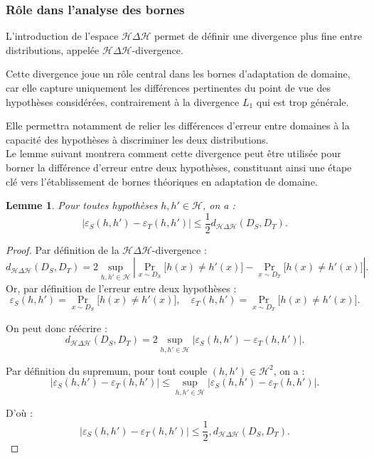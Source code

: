 \documentclass[a4paper,12pt]{article}
\newtheorem{lemma}{Lemme}[section]
\theoremstyle{definition}
\theoremstyle{remark}
\begin{document}
\subsubsection{Rôle dans l’analyse des bornes}

L’introduction de l’espace $\mathcal{H} \Delta \mathcal{H}$ permet de définir une divergence plus fine entre distributions, appelée $\mathcal{H}\Delta\mathcal{H}$-divergence.

Cette divergence joue un rôle central dans les bornes d’adaptation de domaine, car elle capture uniquement les différences pertinentes du point de vue des hypothèses considérées, contrairement à la divergence $L_1$ qui est trop générale.

Elle permettra notamment de relier les différences d’erreur entre domaines à la capacité des hypothèses à discriminer les deux distributions.\\


Le lemme suivant montrera comment cette divergence peut être utilisée pour borner la différence d’erreur entre deux hypothèses, constituant ainsi une étape clé vers l’établissement de bornes théoriques en adaptation de domaine.\\




\begin{lemma}
Pour toutes hypothèses $h, h' \in \mathcal{H}$, on a :
\[
\left| \varepsilon_S(h, h') - \varepsilon_T(h, h') \right|
\leq \frac{1}{2}  d_{\mathcal{H}\Delta\mathcal{H}}(D_S, D_T).
\]
\end{lemma}

\begin{proof}

Par définition de la $\mathcal{H}\Delta\mathcal{H}$-divergence :
\[
d_{\mathcal{H}\Delta\mathcal{H}}(D_S, D_T)
= 2 \sup_{h, h' \in \mathcal{H}}
\left| \Pr_{x \sim D_S}\bigl[h(x) \neq h'(x)\bigr]
- \Pr_{x \sim D_T}\bigl[h(x) \neq h'(x)\bigr] \right|.
\]
Or, par définition de l’erreur entre deux hypothèses :
\[
\varepsilon_S(h, h') = \Pr_{x \sim D_S}\bigl[h(x) \neq h'(x)\bigr],
\quad
\varepsilon_T(h, h') = \Pr_{x \sim D_T}\bigl[h(x) \neq h'(x)\bigr].
\]

On peut donc réécrire :
\[
d_{\mathcal{H}\Delta\mathcal{H}}(D_S, D_T)
= 2 \sup_{h, h' \in \mathcal{H}}
\left| \varepsilon_S(h, h') - \varepsilon_T(h, h') \right|.
\]

Par définition du supremum, pour tout couple $(h, h') \in \mathcal{H}^2$, on a :
\[
\left| \varepsilon_S(h, h') - \varepsilon_T(h, h') \right|
\leq \sup_{h, h' \in \mathcal{H}}
\left| \varepsilon_S(h, h') - \varepsilon_T(h, h') \right|.
\]

D’où :
\[
\left| \varepsilon_S(h, h') - \varepsilon_T(h, h') \right|
\leq \frac{1}{2} , d_{\mathcal{H}\Delta\mathcal{H}}(D_S, D_T).
\]

\end{proof}
\end{document}
